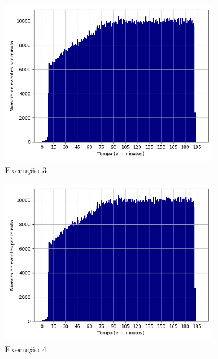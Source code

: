 \begin{figure}[p]
\begin{subfigure}{.5\textwidth}
  \centering
  \includegraphics[width=\linewidth]{figuras/graphics/histogram_vazao_8-dez-is.png} 
  \caption{Execução 3}
  \label{fig:histv-8-dez-is}
\end{subfigure}
\begin{subfigure}{.5\textwidth}
  \centering
  \includegraphics[width=\linewidth]{figuras/graphics/histogram_vazao_9-dez-is.png}  
  \caption{Execução 4}
  \label{fig:histv-9-dez-is}
\end{subfigure}
\begin{subfigure}{.5\textwidth}
  \centering

\end{subfigure}
\end{figure}
